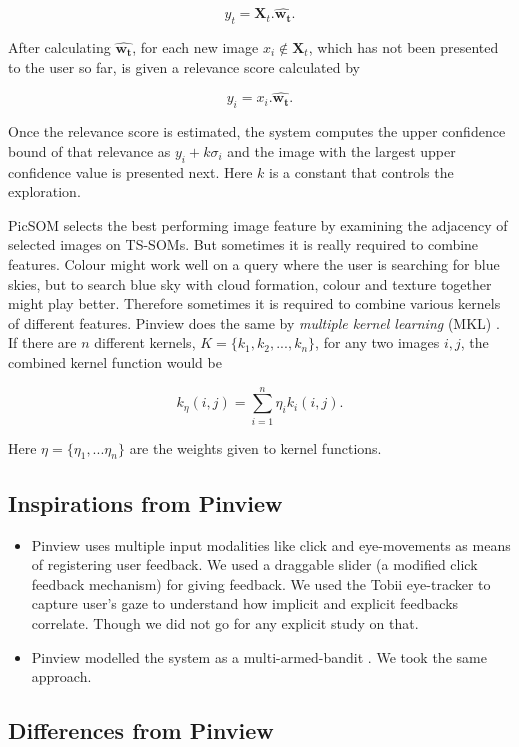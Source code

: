 \documentclass[english]{tktltiki}
\begin{document}
$$
y_t = \mathbf{X}_t . \hat{\mathbf{w_t}}.
$$

After calculating $\hat{\mathbf{w_t}}$, for each new image $x_i \notin \mathbf{X}_t$, which has not been presented to the user so far, is given a relevance score calculated by

$$
y_i = x_i . \hat{\mathbf{w_t}}.
$$

Once the relevance score is estimated, the system computes the upper confidence bound of that relevance as $y_i + k \sigma_i$ and the image with the largest upper confidence value is presented next. Here $k$ is a constant that controls the exploration.

PicSOM selects the best performing image feature by examining the adjacency of selected images on TS-SOMs. But sometimes it is really required to combine features. Colour might work well on a query where the user is searching for blue skies, but to search blue sky with cloud formation, colour and texture together might play better. Therefore sometimes it is required to combine various kernels of different features. Pinview does the same by \textit{multiple kernel learning} (MKL) \cite{mkl}. If there are $n$ different kernels, $K = \{k_1, k_2, ..., k_n\}$, for any two images $i, j$, the combined kernel function \cite{Pinview} would be

$$
k_{\eta}(i, j) = \sum_{i=1}^n \eta_i k_i(i, j).
$$

Here $\eta = \{\eta_1, ...\eta_n\}$ are the weights given to kernel functions.

\subsection{Inspirations from Pinview}

\begin{itemize}
	\item Pinview uses multiple input modalities like click and eye-movements as means of registering user feedback. We used a draggable slider (a modified click feedback mechanism) for giving feedback. We used the Tobii eye-tracker to capture user's gaze to understand how implicit and explicit feedbacks correlate. Though we did not go for any explicit study on that.
	\item Pinview modelled the system as a multi-armed-bandit \cite{bandits}. We took the same approach.
\end{itemize}

\subsection{Differences from Pinview}
\end{document}
